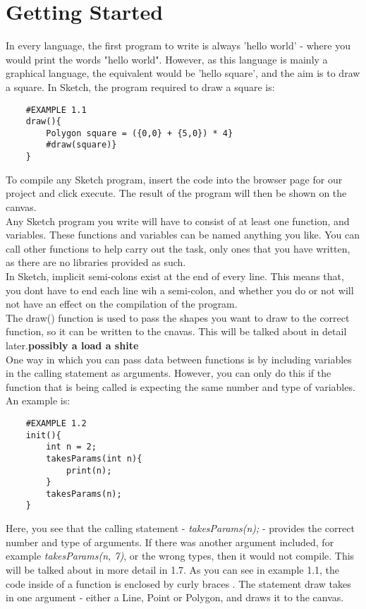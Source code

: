 \documentclass{l3proj}
\begin{document}
\section{Getting Started}
\label{start}
In every language, the first program to write is always 'hello world' - where you would print the words "hello world". However, as this language is mainly a graphical language, the equivalent would be 'hello square', and the aim is to draw a square. In Sketch, the program required to draw a square is:\\
\begin{verbatim}
    #EXAMPLE 1.1
    draw(){
        Polygon square = ({0,0} + {5,0}) * 4}
        #draw(square)}
    }
\end{verbatim}
To compile any Sketch program, insert the code into the browser page for our project and click execute. The result of the program will then be shown on the canvas.
\\ [12pt]
Any Sketch program you write will have to consist of at least one function, and variables. These functions and variables can be named anything you like. You can call other functions to help carry out the task, only ones that you have written, as there are no libraries provided as such. 
\\ [12pt]
In Sketch, implicit semi-colons exist at the end of every line. This means that, you dont have to end each line wih a semi-colon, and whether you do or not will not have an effect on the compilation of the program. 
\\ [12pt]
The draw() function is used to pass the shapes you want to draw to the correct function, so it can be written to the cnavas. This will be talked about in detail later.\textbf{possibly a load a shite}
\\ [12pt]
One way in which you can pass data between functions is by including variables in the calling statement as arguments. However, you can only do this if the function that is being called is expecting the same number and type of variables. An example is:
\begin{verbatim}
    #EXAMPLE 1.2
    init(){
        int n = 2;
        takesParams(int n){
            print(n);
        }
        takesParams(n);
    }
\end{verbatim}
Here, you see that the calling statement - \textit{takesParams(n);} - provides the correct number and type of arguments. If there was another argument included, for example \textit{takesParams(n, 7)}, or the wrong types, then it would not compile. This will be talked about in more detail in 1.7. As you can see in example 1.1, the code inside of a function is enclosed by curly braces {   }. The statement draw takes in one argument - either a Line, Point or Polygon, and draws it to the canvas.
\end{document}
